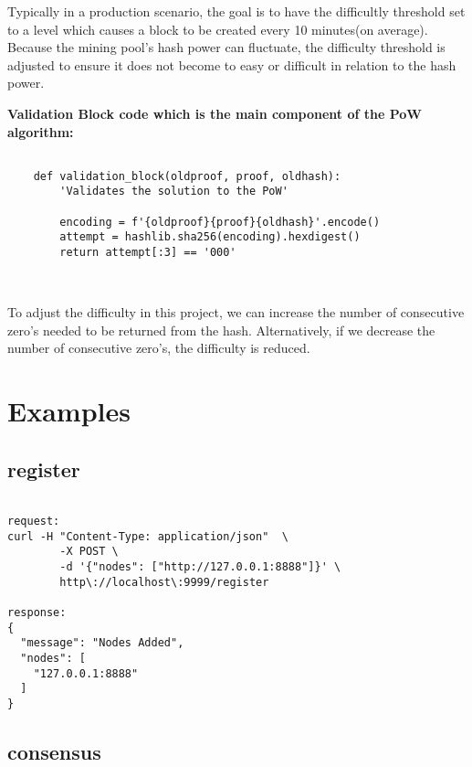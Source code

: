 Typically in a production scenario, the goal is to have the difficultly threshold set to a level which causes a block to be created every 10 minutes(on average). Because the mining pool's hash power can fluctuate, the difficulty threshold is adjusted to ensure it does not become to easy or difficult in relation to the hash power.~\cite{hid-sp18-414-www-pow-vs-pos}

\bigskip
\noindent
\textbf{Validation Block code which is the main component of the PoW algorithm:}
\begin{footnotesize}
\begin{verbatim}

    def validation_block(oldproof, proof, oldhash):
        'Validates the solution to the PoW'

        encoding = f'{oldproof}{proof}{oldhash}'.encode()
        attempt = hashlib.sha256(encoding).hexdigest()
        return attempt[:3] == '000'

        
\end{verbatim}
\end{footnotesize}

To adjust the difficulty in this project, we can increase the number of consecutive zero's needed to be returned from the hash. Alternatively, if we decrease the number of consecutive zero's, the difficulty is reduced. 

\section{Examples}

\subsection{register}

\bigskip
\noindent
\begin{footnotesize}
\begin{verbatim}

request:
curl -H "Content-Type: application/json"  \
        -X POST \
        -d '{"nodes": ["http://127.0.0.1:8888"]}' \
        http\://localhost\:9999/register

response:
{
  "message": "Nodes Added",
  "nodes": [
    "127.0.0.1:8888"
  ]
}

\end{verbatim}
\end{footnotesize}

\subsection{consensus}

